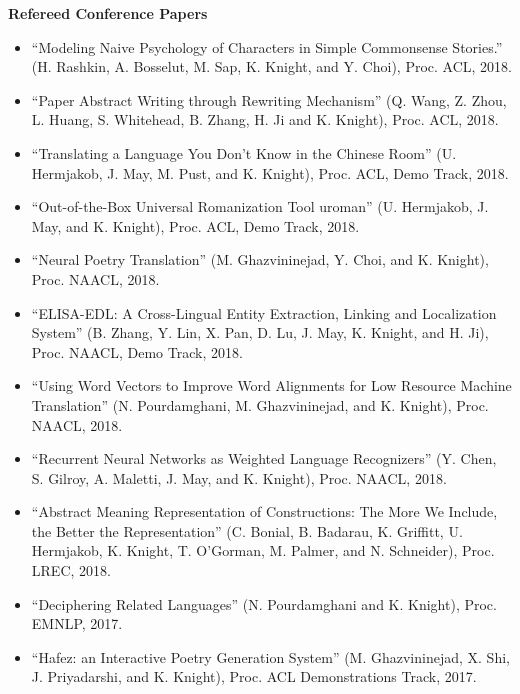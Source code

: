 \noindent
{\bf Refereed Conference Papers}
\begin{itemize}

\item ``Modeling Naive Psychology of Characters in Simple Commonsense Stories.'' (H. Rashkin, A. Bosselut, M. Sap, K. Knight, and Y. Choi), Proc. ACL, 2018.

\item ``Paper Abstract Writing through Rewriting Mechanism'' (Q. Wang, Z. Zhou, L. Huang, S. Whitehead, B. Zhang, H. Ji and K. Knight), Proc. ACL, 2018.

\item ``Translating a Language You Don't Know in the Chinese Room'' (U. Hermjakob, J. May, M. Pust, and K. Knight), Proc. ACL, Demo Track, 2018.

\item ``Out-of-the-Box Universal Romanization Tool uroman'' (U. Hermjakob, J. May, and K. Knight), Proc. ACL, Demo Track, 2018.

\item ``Neural Poetry Translation'' (M. Ghazvininejad, Y. Choi, and K. Knight), Proc. NAACL, 2018.

\item ``ELISA-EDL: A Cross-Lingual Entity Extraction, Linking and Localization System'' (B. Zhang, Y. Lin, X. Pan, D. Lu, J. May, K. Knight, and H. Ji), Proc. NAACL, Demo Track, 2018.

\item ``Using Word Vectors to Improve Word Alignments for Low Resource Machine Translation'' (N. Pourdamghani, M. Ghazvininejad, and K. Knight), Proc. NAACL, 2018.

\item ``Recurrent Neural Networks as Weighted Language Recognizers'' (Y. Chen, S. Gilroy, A. Maletti, J. May, and K. Knight), Proc. NAACL, 2018. 

\item ``Abstract Meaning Representation of Constructions: The More We Include, the Better the Representation'' (C. Bonial, B. Badarau, K. Griffitt, U. Hermjakob, K. Knight, T. O'Gorman, M. Palmer, and N. Schneider), Proc. LREC, 2018. 

\item ``Deciphering Related Languages'' (N. Pourdamghani and K. Knight), Proc. EMNLP, 2017. 

\item ``Hafez: an Interactive Poetry Generation System'' (M. Ghazvininejad, 
 X. Shi, J. Priyadarshi, and K. Knight), 
 Proc. ACL Demonstrations Track, 2017. 


\end{itemize}
